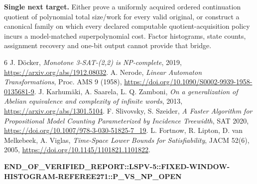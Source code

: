 \documentclass[11pt]{article}
\begin{document}
\noindent\textbf{Single next target.} Either prove a uniformly acquired ordered
continuation quotient of polynomial total size/work for every valid original, or
construct a canonical family on which every declared computable quotient-acquisition
policy incurs a model-matched superpolynomial cost.  Factor histograms, state counts,
assignment recovery and one-bit output cannot provide that bridge.

\begin{thebibliography}{6}
 J. D\"ocker, \emph{Monotone 3-SAT-(2,2) is NP-complete}, 2019, \url{https://arxiv.org/abs/1912.08032}.
 A. Nerode, \emph{Linear Automaton Transformations}, Proc. AMS 9 (1958), \url{https://doi.org/10.1090/S0002-9939-1958-0135681-9}.
 J. Karhum\"aki, A. Saarela, L. Q. Zamboni, \emph{On a generalization of Abelian equivalence and complexity of infinite words}, 2013, \url{https://arxiv.org/abs/1301.5104}.
 F. Slivovsky, S. Szeider, \emph{A Faster Algorithm for Propositional Model Counting Parameterized by Incidence Treewidth}, SAT 2020, \url{https://doi.org/10.1007/978-3-030-51825-7_19}.
 L. Fortnow, R. Lipton, D. van Melkebeek, A. Viglas, \emph{Time-Space Lower Bounds for Satisfiability}, JACM 52(6), 2005, \url{https://doi.org/10.1145/1101821.1101822}.
\end{thebibliography}

\noindent\small\textbf{END\_OF\_VERIFIED\_REPORT::LSPV-5::FIXED-WINDOW-\\
HISTOGRAM-REFEREE271::P\_VS\_NP\_OPEN}
\end{document}

